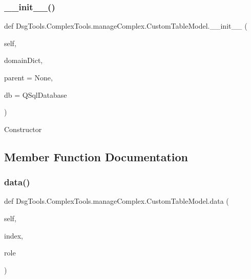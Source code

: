 \subsubsection{\texorpdfstring{\+\_\+\+\_\+init\+\_\+\+\_\+()}{\_\_init\_\_()}}
{\footnotesize\ttfamily def Dsg\+Tools.\+Complex\+Tools.\+manage\+Complex.\+Custom\+Table\+Model.\+\_\+\+\_\+init\+\_\+\+\_\+ (\begin{DoxyParamCaption}\item[{}]{self,  }\item[{}]{domain\+Dict,  }\item[{}]{parent = {\ttfamily None},  }\item[{}]{db = {\ttfamily QSqlDatabase} }\end{DoxyParamCaption})}

\begin{DoxyVerb}Constructor
\end{DoxyVerb}
 

\subsection{Member Function Documentation}
\mbox{\label{class_dsg_tools_1_1_complex_tools_1_1manage_complex_1_1_custom_table_model_a4bc6d5b14b974fedeca4716f5b45cd96}} 
\subsubsection{\texorpdfstring{data()}{data()}}
{\footnotesize\ttfamily def Dsg\+Tools.\+Complex\+Tools.\+manage\+Complex.\+Custom\+Table\+Model.\+data (\begin{DoxyParamCaption}\item[{}]{self,  }\item[{}]{index,  }\item[{}]{role }\end{DoxyParamCaption})}

